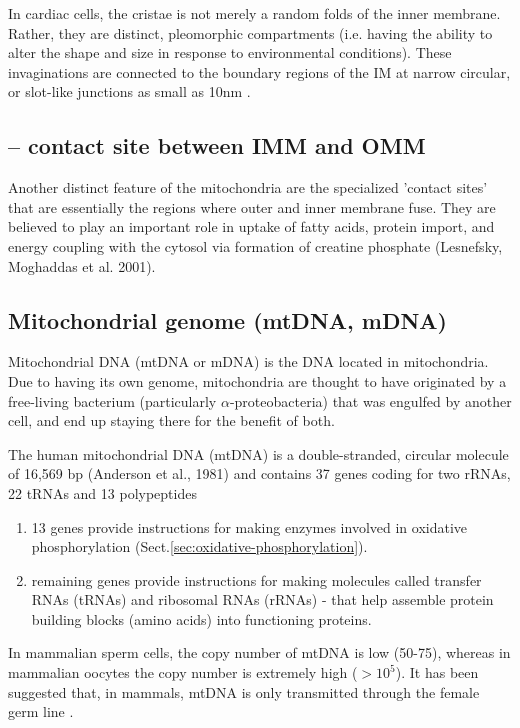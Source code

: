 In cardiac cells, the cristae is not merely a random folds of the inner
membrane. Rather, they are distinct, pleomorphic compartments (i.e. having the
ability to alter the shape and size in response to environmental conditions).
These invaginations are connected to the boundary regions of the IM at narrow
circular, or slot-like junctions as small as 10nm \citep{mannella2001}.




\subsection{-- contact site between IMM and OMM}

Another distinct feature of the mitochondria are the specialized 'contact sites'
that are essentially the regions where outer and inner membrane fuse. They are
believed to play an important role in uptake of fatty acids, protein import, and
energy coupling with the cytosol via formation of creatine phosphate (Lesnefsky,
Moghaddas et al. 2001).




\subsection{Mitochondrial genome (mtDNA, mDNA)}
\label{sec:mito-genome}

Mitochondrial DNA (mtDNA or mDNA) is the DNA located in mitochondria.
Due to having its own genome, mitochondria are thought to have originated by a
free-living bacterium (particularly $\alpha$-proteobacteria) that was engulfed
by another cell, and end up staying there for the benefit of both.


The human mitochondrial DNA (mtDNA) is a double-stranded, circular molecule of
16,569 bp (Anderson et al., 1981) and contains 37 	genes coding for two rRNAs,
22 tRNAs and 13 polypeptides
\begin{enumerate}
  \item 13 genes provide instructions  for making enzymes involved in oxidative
  phosphorylation (Sect.\ref{sec:oxidative-phosphorylation}).

  \item remaining genes provide instructions for making molecules called
  transfer RNAs (tRNAs) and ribosomal RNAs (rRNAs) - that help assemble protein
  building blocks (amino acids) into functioning proteins.
\end{enumerate}
In mammalian sperm cells, the copy number of mtDNA is low (50-75), whereas
in mammalian oocytes the copy number is extremely high ($>10^5$). It has been
suggested that, in mammals, mtDNA is only transmitted through the female germ
line \citep{taanman1999}.


